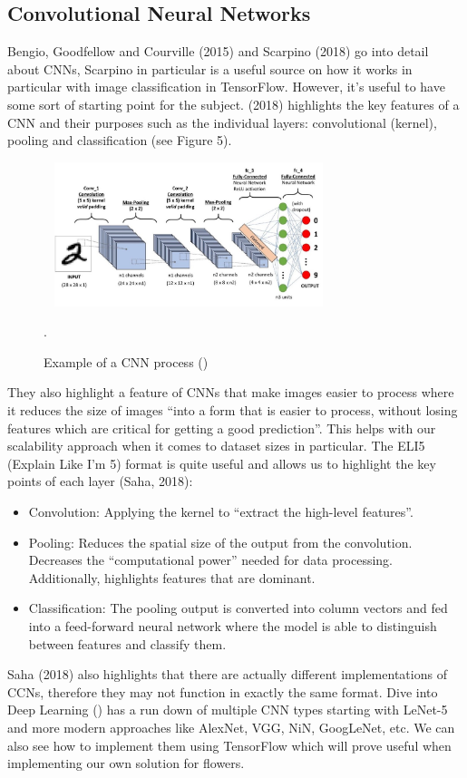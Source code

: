 \documentclass{article}
\begin{document}
\subsection{Convolutional Neural Networks}
Bengio, Goodfellow and Courville (2015) and Scarpino (2018) go into detail about CNNs, Scarpino in particular is a
useful source on how it works in particular with image classification in TensorFlow. However, it’s useful to have 
some sort of starting point for the subject. \citeauthor{saha2018} (2018) highlights the key features of a CNN and their purposes such 
as the individual layers: convolutional (kernel),  pooling and classification (see Figure 5).
\newpage
\begin{figure}[h]\
    \centering
    \includegraphics[width=0.7\textwidth]{saha.jpg}
    \caption{Example of a CNN process (\cite{saha2018})}.
\end{figure}
They also highlight a feature of CNNs that make images easier to process where it reduces the size of images “into a 
form that is easier to process, without losing features which are critical for getting a good prediction”. This helps 
with our scalability approach when it comes to dataset sizes in particular. The ELI5 (Explain Like I’m 5) format is 
quite useful and allows us to highlight the key points of each layer (Saha, 2018):
\begin{itemize}
    \item Convolution: Applying the kernel to “extract the high-level features”.
    \item Pooling: Reduces the spatial size of the output from the convolution. Decreases the “computational power” 
    needed for data processing. Additionally, highlights features that are dominant.
    \item Classification: The pooling output is converted into column vectors and fed into a feed-forward neural 
    network where the model is able to distinguish between features and classify them.
\end{itemize}
Saha (2018) also highlights that there are actually different implementations of CCNs, therefore they may not function 
in exactly the same format. Dive into Deep Learning (\cite{diveintodeeplearning}) has a run down of multiple CNN types starting with LeNet-5 
and more modern approaches like AlexNet, VGG, NiN, GoogLeNet, etc. We can also see how to implement them using 
TensorFlow which will prove useful when implementing our own solution for flowers.
\end{document}
